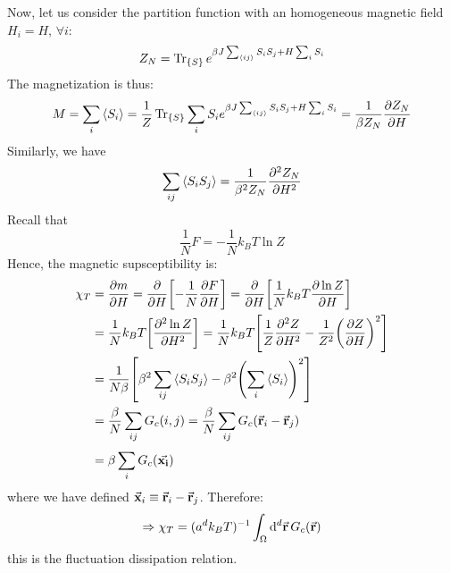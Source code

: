 \documentclass[../main/main.tex]{subfiles}
\begin{document}
Now, let us consider the partition function with an homogeneous magnetic field \( H_i = H\), \( \forall i \):
\begin{equation*}
  Z_N = \Tr_{\{ S \}  } e^{ \beta J \sum_{\expval{ij} }^{} S_i S_j + H \sum_{i}^{} S_i   }
\end{equation*}
The magnetization is thus:
\begin{equation*}
  M = \sum_{i}^{} \expval{S_i} = \frac{1}{Z} \Tr_{\{ S \}  } \sum_{i}^{} S_i   e^{ \beta J \sum_{\expval{ij} }^{} S_i S_j + H \sum_{i}^{} S_i    } = \frac{1}{\beta Z_N} \pdv{Z_N}{H}
\end{equation*}
Similarly, we have
\begin{equation*}
  \sum_{ij}^{} \expval{S_i S_j} = \frac{1}{\beta ^2 Z_N} \pdv[2]{Z_N}{H}
\end{equation*}
Recall that
\begin{equation*}
   \frac{1}{N} F =  - \frac{1}{N} k_B T \ln{Z}
\end{equation*}
Hence, the magnetic supsceptibility is:
\begin{equation*}
\begin{split}
  \chi _T & = \pdv{m}{H} = \pdv{}{H} \qty[- \frac{1}{N} \pdv{F}{H} ] = \pdv{}{H}  \qty[\frac{1}{N} k_B T \pdv{\ln{Z} }{H} ] \\
  & = \frac{1}{N} k_B T \qty[\pdv[2]{\ln{Z} }{H} ] = \frac{1}{N} k_B T \qty[\frac{1}{Z} \pdv[2]{Z}{H} - \frac{1}{Z^2} \qty(\pdv{Z}{H} )^2 ] \\
  & = \frac{1}{N \beta } \qty[\beta ^2 \sum_{ij}^{} \expval{S_i S_j}  - \beta ^2 \qty(\sum_{i}^{} \expval{S_i}  )^2   ] \\
  & = \frac{\beta }{N} \sum_{ij}^{}  G_c (i,j) = \frac{\beta }{N} \sum_{ij}^{} G_c (\va{r}_i - \va{r}_j) \\
  & = \beta \sum_{i}^{} G_c (\va{x_i})
\end{split}
\end{equation*}
where we have defined \( \va{x}_i \equiv \va{r}_i - \va{r}_j \). Therefore:
\begin{equation}
  \Rightarrow \chi _T = (a^d k_B T)^{-1} \int_{\Omega }^{} \dd[d]{\va{r}} G_c (\va{r})
\label{eq:16_7}
\end{equation}
this is the fluctuation dissipation relation.
\end{document}
